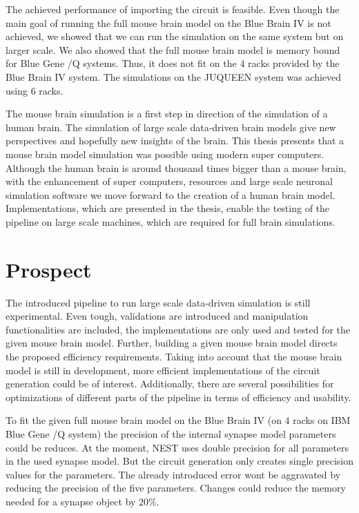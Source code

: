 The achieved performance of importing the circuit is feasible.
Even though the main goal of running the full mouse brain model on the Blue Brain IV is not achieved,
we showed that we can run the simulation on the same system but on larger scale.
We also showed  that the full mouse brain model is memory bound for Blue Gene /Q systems.
Thus, it does not fit on the $4$ racks provided by the Blue Brain IV system. 
The simulations on the JUQUEEN system was achieved using $6$ racks.

The mouse brain simulation is a first step in direction of the simulation of a human brain. The simulation of large scale data-driven brain models give new perspectives and hopefully new insights of the brain.
This thesis presents that a mouse brain model simulation was possible using modern super computers. Although the human brain is around thousand times bigger than a mouse brain, with the enhancement of super computers, resources and large scale neuronal simulation software we move forward to the creation of a human brain model. 
Implementations, which are presented in the thesis, enable the testing of the pipeline on
large scale machines, which are required for full brain simulations.



\chapter{Prospect}
The introduced pipeline to run large scale data-driven simulation is still experimental.
Even tough, validations are introduced and manipulation functionalities are included, the 
implementations are only used and tested for the given mouse brain model. Further, building a given 
mouse brain model directs the proposed efficiency requirements. Taking into account that
the mouse brain model is still in development, more efficient implementations of the 
circuit generation could be of interest.
Additionally, there are several possibilities for optimizations of different parts of the pipeline in terms of efficiency and usability.

To fit the given full mouse brain model on the Blue Brain IV (on $4$ racks on IBM Blue Gene /Q system) the precision of  the internal synapse model parameters could be reduces.
At the moment, NEST uses double precision
for all parameters in the used synapse model.
But the circuit generation only creates single precision values for the parameters.
The already introduced error wont be aggravated
by reducing the precision of the five parameters.
Changes could reduce the memory needed for a synapse object by $20\%$. 

